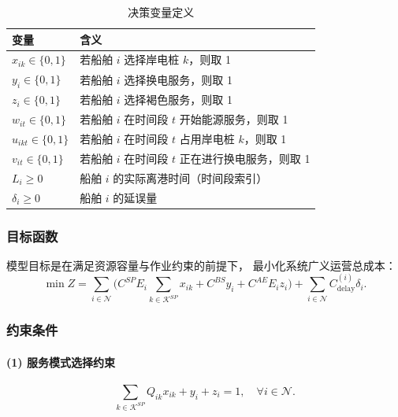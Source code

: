 \documentclass[UTF8, a4paper, 12pt]{ctexart}
\begin{document}
\begin{table}[htbp]
\centering
\caption{决策变量定义}
\begin{tabular}{ll}
\toprule
变量 & 含义 \\
\midrule
$x_{ik} \in \{0,1\}$ & 若船舶 $i$ 选择岸电桩 $k$，则取 1 \\
$y_i \in \{0,1\}$ & 若船舶 $i$ 选择换电服务，则取 1 \\
$z_i \in \{0,1\}$ & 若船舶 $i$ 选择褐色服务，则取 1 \\
$w_{it} \in \{0,1\}$ & 若船舶 $i$ 在时间段 $t$ 开始能源服务，则取 1 \\
$u_{ikt} \in \{0,1\}$ & 若船舶 $i$ 在时间段 $t$ 占用岸电桩 $k$，则取 1 \\
$v_{it} \in \{0,1\}$ & 若船舶 $i$ 在时间段 $t$ 正在进行换电服务，则取 1 \\
$L_i \ge 0$ & 船舶 $i$ 的实际离港时间（时间段索引） \\
$\delta_i \ge 0$ & 船舶 $i$ 的延误量 \\
\bottomrule
\end{tabular}
\end{table}


\subsubsection{目标函数}

模型目标是在满足资源容量与作业约束的前提下，
最小化系统广义运营总成本：
\begin{equation}
\min Z =
\sum_{i \in \mathcal{N}}
\Big(
C^{SP} E_i \sum_{k \in \mathcal{K}^{SP}} x_{ik}
+ C^{BS} y_i
+ C^{AE} E_i z_i
\Big)
+ \sum_{i \in \mathcal{N}} C^{(i)}_{\text{delay}} \delta_i .
\label{eq:obj_24_final}
\end{equation}

\subsubsection{约束条件}

\paragraph{(1) 服务模式选择约束}
\begin{equation}
\sum_{k \in \mathcal{K}^{SP}} Q_{ik} x_{ik} + y_i + z_i = 1,
\quad \forall i \in \mathcal{N}.
\label{eq:mode_24_final}
\end{equation}
\end{document}
